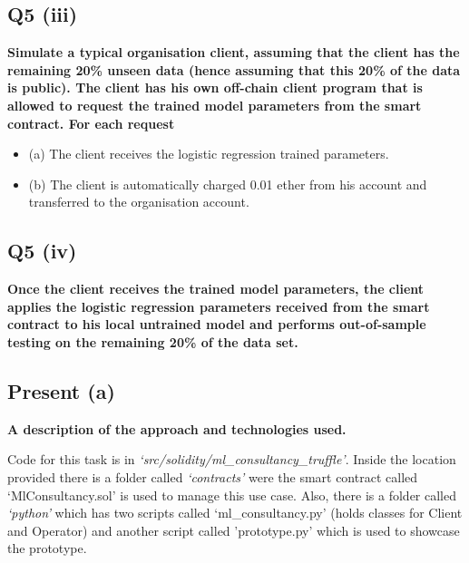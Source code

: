 \subsection{Q5 (iii)}\label{sssec:pt2q5iii}

\textbf{Simulate a typical organisation client, assuming that the client has the remaining 20\% unseen data (hence assuming that this 20\% of the data is public). The client has his own off-chain client program that is allowed to request the trained model parameters from the smart contract. For each request}

\begin{itemize}
  \item (a) The client receives the logistic regression trained parameters.
  \item (b) The client is automatically charged 0.01 ether from his account and transferred to the organisation account. 
\end{itemize}



\subsection{Q5 (iv)}\label{sssec:pt2q5iv}

\textbf{Once the client receives the trained model parameters, the client applies the logistic regression parameters received from the smart contract to his local untrained model and performs out-of-sample testing on the remaining 20\% of the data set. }



\subsection{Present (a)}\label{sssec:pt2q5a}

\textbf{A description of the approach and technologies used.}

\noindent
Code for this task is in \textit{‘src/solidity/ml\_consultancy\_truffle’}. Inside the location provided there is a folder called \textit{‘contracts’} were the smart contract called ‘MlConsultancy.sol’ is used to manage this use case. Also, there is a folder called \textit{‘python’} which has two scripts called ‘ml\_consultancy.py’ (holds classes for Client and Operator) and another script called 'prototype.py' which is used to showcase the prototype. 

